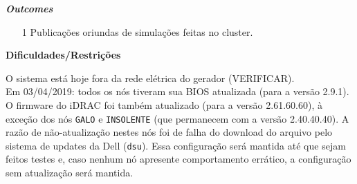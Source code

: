 
\textbf{\textit{Outcomes}}

\begin{itemize}
	\item[1] Publicações oriundas de simulações feitas no cluster.
\end{itemize}


\textbf{Dificuldades/Restrições}

O sistema está hoje fora da rede elétrica do gerador (VERIFICAR).\\






Em 03/04/2019: todos os nós tiveram sua BIOS atualizada (para a versão 2.9.1). O firmware do iDRAC foi também atualizado (para a versão 2.61.60.60), à exceção dos nós \texttt{GALO} e \texttt{INSOLENTE} (que permanecem com a versão 2.40.40.40). A razão de não-atualização nestes nós foi de falha do download do arquivo pelo sistema de updates da Dell (\texttt{dsu}). Essa configuração será mantida 
até que sejam feitos testes e, caso nenhum nó apresente comportamento errático, 
a configuração sem atualização será mantida.\\

